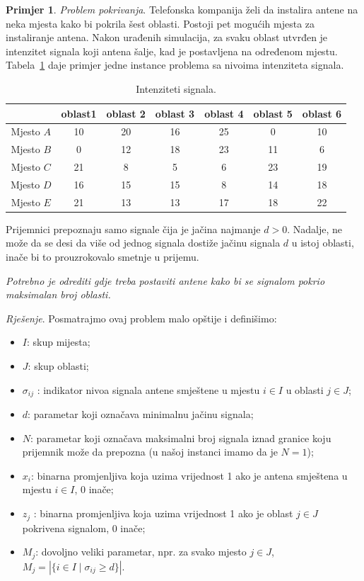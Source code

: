 \documentclass[a4paper, utf8, 11pt, colorlinks]{book}
\theoremstyle{definition}
\newtheorem{primjer}{Primjer}[chapter]
\begin{document}
\begin{primjer}

\emph{Problem pokrivanja}. Telefonska kompanija želi da instalira antene na neka mjesta kako bi pokrila šest oblasti. Postoji pet mogućih mjesta za instaliranje antena. Nakon urađenih simulacija, za svaku oblast utvrđen je intenzitet signala koji antena šalje, kad je postavljena na određenom mjestu. Tabela~\ref{tab:tb-3} daje   primjer jedne instance problema sa nivoima intenziteta signala.

\begin{table}[!ht]
	\centering
	\begin{tabular}{c|cccccc} \hline
		\              & oblast1 & oblast 2 & oblast 3 & oblast 4 & oblast 5 & oblast 6 \\ \hline
		Mjesto $A$     & 10  & 20 & 16 & 25 & 0   & 10   \\
		Mjesto $B$     & 0   & 12 & 18 &  23 & 11 & 6   \\
		Mjesto $C$     & 21  &  8 & 5  &  6 & 23  &  19 \\
		Mjesto $D$    &  16 &  15 & 15 &  8 & 14 & 18   \\
		Mjesto $E $    &  21 & 13 & 13 & 17 & 18  & 22    \\ \hline
	\end{tabular}
	\caption{Intenziteti signala.}
	\label{tab:tb-3}
\end{table}

Prijemnici prepoznaju samo signale čija je jačina najmanje   $d>0$. Nadalje, ne može da se desi da više od jednog signala  dostiže jačinu signala $d$ u istoj oblasti, inače bi to prouzrokovalo smetnje u prijemu. %

\emph{Potrebno je odrediti gdje treba postaviti antene kako bi se signalom pokrio maksimalan broj oblasti.}
\end{primjer}
\emph{Rješenje}. Posmatrajmo ovaj problem malo opštije i definišimo: 
\begin{itemize}
	\item $I$: skup mijesta;
	\item $J$: skup oblasti;
	\item $\sigma_{ij}$ : indikator nivoa signala antene   smještene u mjestu $i \in I$ u oblasti $j \in J$;
	\item $d$: parametar koji označava minimalnu jačinu signala;
	\item $N$: parametar koji označava maksimalni broj signala iznad granice koju prijemnik može da prepozna (u našoj instanci imamo da je $N=1$);
	\item $x_i$: binarna promjenljiva koja uzima vrijednost 1 ako je antena smještena u mjestu $i\in I$, 0 inače;
	\item  $z_j$ : binarna promjenljiva koja uzima vrijednost 1 ako je oblast $j \in J$ pokrivena signalom, 0 inače;
	\item $M_j$: dovoljno veliki parametar, npr. za svako mjesto $j \in J$, $M_j= |\{ i \in I \mid \sigma_{ij} \geq d\}|$.
\end{itemize}
\end{document}
